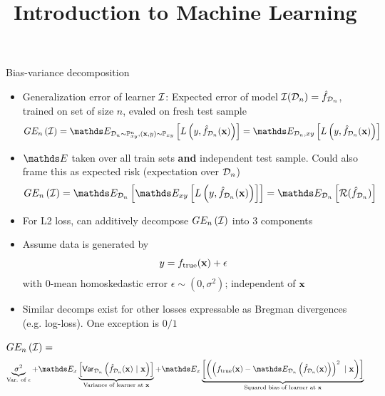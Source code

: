 \documentclass[11pt,compress,t,notes=noshow, xcolor=table]{beamer}
\title{Introduction to Machine Learning}
\begin{document}
    

\begin{vbframe} {Bias-variance decomposition}

\begin{itemize} 
\item Generalization error of learner  $\mathcal{I}$: 
Expected error of model $\mathcal{I}(\mathcal{D}_n) = \hat{f}_{\mathcal{D}_n}$, trained on set of size $n$, evaled on fresh test sample
$$
GE_n\left(\ind\right) = \E_{\D_n \sim \Pxy^n, (\xv, y) \sim \Pxy}\left[ L\left(y, \fh_{\D_n}(\xv)\right) \right] = \E_{\D_n, xy}\left[L\left(y, \fh_{\D_n}(\xv)\right) \right]  
$$

\item $\E$ taken over all train sets \textbf{and} independent test sample. Could also frame this as expected risk (expectation over $\mathcal{D}_n$)
$$GE_n\left(\ind\right) = \E_{\D_n}\left[\E_{xy}\left[ L\left(y, \fh_{\D_n}(\xv)\right)\right]\right] =  \E_{\D_n}\left[\risk(\fh_{\D_n})\right]$$

\item For L2 loss, can additively decompose  $GE_n\left(\mathcal{I}\right)$ into 3 components

\item Assume data is generated by 
$$
y = f_{\text{true}}(\mathbf{x}) + \epsilon
$$
with 0-mean homoskedastic error $\epsilon \sim (0, \sigma^2)$; independent of $\mathbf{x}$

\item Similar decomps exist for other losses expressable as Bregman divergences (e.g. log-loss). One exception is $0/1$ 

\end{itemize} 

\framebreak 


$GE_n\left(\mathcal{I}\right) =$  
$$
 \underbrace{\sigma^2}_{\text{Var. of $\epsilon$}} + \E_{x}\underbrace{\left[\var_{\D_n}\left(\fh_{\D_n}(\xv) ~|~\xv\right)\right]}_{\text{Variance of learner at } \xv} + \E_{x}\underbrace{\left[\left(\left(\ftrue(\xv)-\E_{\D_n}\left(\fh_{\D_n}(\xv)\right)\right)^2~|~\xv\right)\right]}_{\text{Squared bias of learner at } \xv}  
$$


\end{vbframe}
\end{document}
